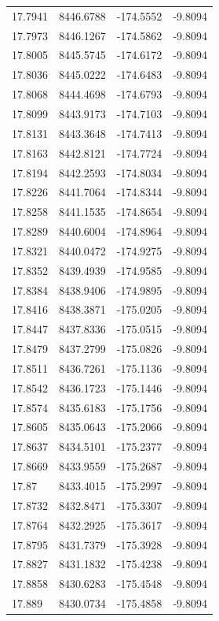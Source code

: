 \begin{table}[H]
\begin{tabular}{llll}
17.7941 & 8446.6788 & -174.5552 & -9.8094 \\
17.7973 & 8446.1267 & -174.5862 & -9.8094 \\
17.8005 & 8445.5745 & -174.6172 & -9.8094 \\
17.8036 & 8445.0222 & -174.6483 & -9.8094 \\
17.8068 & 8444.4698 & -174.6793 & -9.8094 \\
17.8099 & 8443.9173 & -174.7103 & -9.8094 \\
17.8131 & 8443.3648 & -174.7413 & -9.8094 \\
17.8163 & 8442.8121 & -174.7724 & -9.8094 \\
17.8194 & 8442.2593 & -174.8034 & -9.8094 \\
17.8226 & 8441.7064 & -174.8344 & -9.8094 \\
17.8258 & 8441.1535 & -174.8654 & -9.8094 \\
17.8289 & 8440.6004 & -174.8964 & -9.8094 \\
17.8321 & 8440.0472 & -174.9275 & -9.8094 \\
17.8352 & 8439.4939 & -174.9585 & -9.8094 \\
17.8384 & 8438.9406 & -174.9895 & -9.8094 \\
17.8416 & 8438.3871 & -175.0205 & -9.8094 \\
17.8447 & 8437.8336 & -175.0515 & -9.8094 \\
17.8479 & 8437.2799 & -175.0826 & -9.8094 \\
17.8511 & 8436.7261 & -175.1136 & -9.8094 \\
17.8542 & 8436.1723 & -175.1446 & -9.8094 \\
17.8574 & 8435.6183 & -175.1756 & -9.8094 \\
17.8605 & 8435.0643 & -175.2066 & -9.8094 \\
17.8637 & 8434.5101 & -175.2377 & -9.8094 \\
17.8669 & 8433.9559 & -175.2687 & -9.8094 \\
17.87 & 8433.4015 & -175.2997 & -9.8094 \\
17.8732 & 8432.8471 & -175.3307 & -9.8094 \\
17.8764 & 8432.2925 & -175.3617 & -9.8094 \\
17.8795 & 8431.7379 & -175.3928 & -9.8094 \\
17.8827 & 8431.1832 & -175.4238 & -9.8094 \\
17.8858 & 8430.6283 & -175.4548 & -9.8094 \\
17.889 & 8430.0734 & -175.4858 & -9.8094 \\

\end{tabular}
\end{table}
